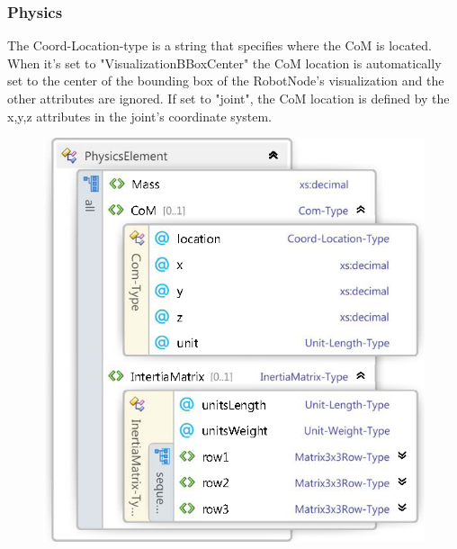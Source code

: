 \documentclass{book}
\begin{document}
\subsubsection{Physics}
The Coord-Location-type is a string that specifies where the CoM is located. When it's set to "VisualizationBBoxCenter" the CoM location is automatically set to the center of the bounding box of the RobotNode's visualization and the other attributes are ignored. If set to "joint", the CoM location is defined by the x,y,z attributes in the joint's coordinate system. 
\begin{figure}[H]
	\centering
	\includegraphics[scale = 0.3]{Xsd_Physics}
\end{figure}
\end{document}
